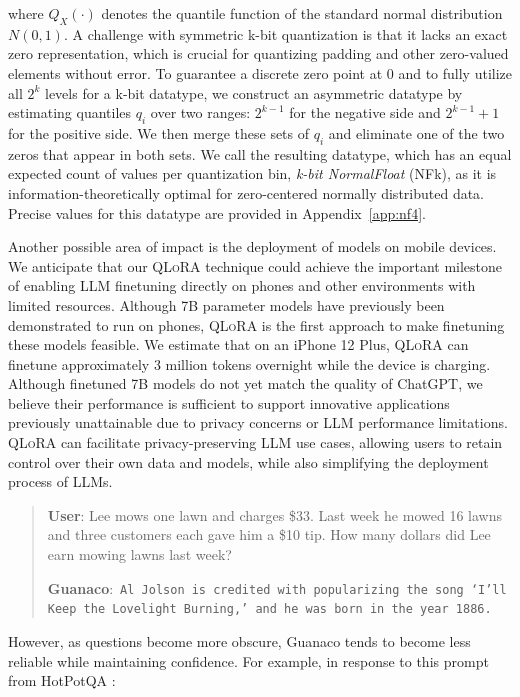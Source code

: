 where $Q_X(\cdot)$ denotes the quantile function of the standard normal distribution $N(0,1)$. A challenge with symmetric k-bit quantization is that it lacks an exact zero representation, which is crucial for quantizing padding and other zero-valued elements without error. To guarantee a discrete zero point at $0$ and to fully utilize all $2^k$ levels for a k-bit datatype, we construct an asymmetric datatype by estimating quantiles $q_i$ over two ranges: $2^{k-1}$ for the negative side and $2^{k-1}+1$ for the positive side. We then merge these sets of $q_i$ and eliminate one of the two zeros that appear in both sets. We call the resulting datatype, which has an equal expected count of values per quantization bin, \emph{k-bit NormalFloat} (NFk), as it is information-theoretically optimal for zero-centered normally distributed data. Precise values for this datatype are provided in Appendix~\ref{app:nf4}.

Another possible area of impact is the deployment of models on mobile devices. We anticipate that our \textsc{QLoRA} technique could achieve the important milestone of enabling LLM finetuning directly on phones and other environments with limited resources. Although 7B parameter models have previously been demonstrated to run on phones, \textsc{QLoRA} is the first approach to make finetuning these models feasible. We estimate that on an iPhone 12 Plus, \textsc{QLoRA} can finetune approximately 3 million tokens overnight while the device is charging. Although finetuned 7B models do not yet match the quality of ChatGPT, we believe their performance is sufficient to support innovative applications previously unattainable due to privacy concerns or LLM performance limitations. \textsc{QLoRA} can facilitate privacy-preserving LLM use cases, allowing users to retain control over their own data and models, while also simplifying the deployment process of LLMs.

\begin{quote}
    \textbf{User}: Lee mows one lawn and charges \$33. Last week he mowed 16 lawns and three customers each gave him a \$10 tip. How many dollars did Lee earn mowing lawns last week?

     \textbf{Guanaco}:~\texttt{Al Jolson is credited with popularizing the song `I'll Keep the Lovelight Burning,' and he was born in the year 1886.}
 \end{quote}

However, as questions become more obscure, {Guanaco} tends to become less reliable while maintaining confidence. For example, in response to this prompt from HotPotQA \citep{yang2018hotpotqa}:

